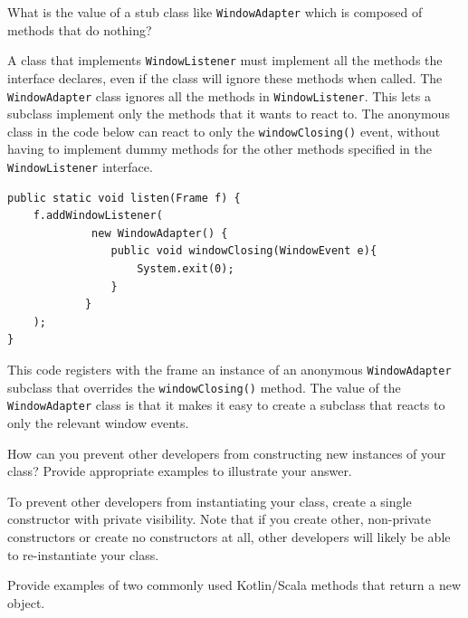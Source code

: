 \documentclass[answers,12pt,a4paper]{exam}
\newcommand{\code}{/Users/keith/Documents/Courses/sdp/repo/worksheets/dp-one/kotlin/src}
\begin{document}
\begin{questions}
\question %
What is the value of a stub class like \verb!WindowAdapter! which is composed of methods that do nothing?

%

\begin{solution}
A class that implements \verb!WindowListener! must implement all the methods the 
interface declares, even if the class will ignore these methods when called. 
The \verb!WindowAdapter! class ignores all the methods in \verb!WindowListener!. 
This lets a subclass implement only the methods that it wants to react to. 
The anonymous class in the code below can react to only the \verb!windowClosing()! 
event, without having to implement dummy methods for the other methods specified in the 
\verb!WindowListener! interface.
\begin{Verbatim}
public static void listen(Frame f) {
    f.addWindowListener(
             new WindowAdapter() {
                public void windowClosing(WindowEvent e){
					System.exit(0);
				} 
			}
	);
}
\end{Verbatim}
This code registers with the frame an instance of an anonymous \verb!WindowAdapter! 
subclass that overrides the \verb!windowClosing()! method. 
The value of the \verb!WindowAdapter! class is that it makes it easy to create 
a subclass that reacts to only the relevant window events.	
\end{solution}

\question %
How can you prevent other developers from constructing new instances of your class? 
Provide appropriate examples to illustrate your answer.

\begin{solution}
To prevent other developers from instantiating your class, 
create a single constructor with private visibility. Note that if you create other, 
non-private constructors or create no constructors at all, other developers will likely 
be able to re-instantiate your class.
\end{solution}

%
%
%
%
\question %
Provide examples of two commonly used Kotlin/Scala methods that return a new object.


\end{questions}
\end{document}
